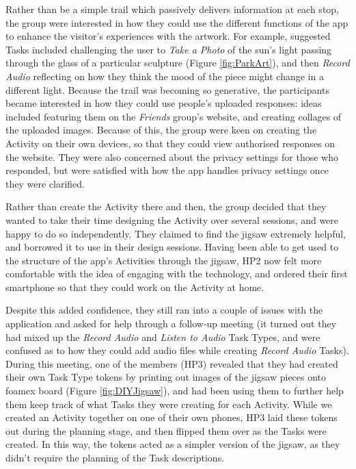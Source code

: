Rather than be a simple trail which passively delivers information at each stop, the group were interested in how they could use the different functions of the app to enhance the visitor's experiences with the artwork. For example, suggested Tasks included challenging the user to \textit{Take a Photo} of the sun's light passing through the glass of a particular sculpture (Figure \ref{fig:ParkArt}), and then \textit{Record Audio} reflecting on how they think the mood of the piece might change in a different light. Because the trail was becoming so generative, the participants became interested in how they could use people's uploaded responses: ideas included featuring them on the \textit{Friends} group's website, and creating collages of the uploaded images. Because of this, the group were keen on creating the Activity on their own devices, so that they could view authorised responses on the website. They were also concerned about the privacy settings for those who responded, but were satisfied with how the app handles privacy settings once they were clarified.

Rather than create the Activity there and then, the group decided that they wanted to take their time designing the Activity over several sessions, and were happy to do so independently. They claimed to find the jigsaw extremely helpful, and borrowed it to use in their design sessions. Having been able to get used to the structure of the app's Activities through the jigsaw, HP2 now felt more comfortable with the idea of engaging with the technology, and ordered their first smartphone so that they could work on the Activity at home.

Despite this added confidence, they still ran into a couple of issues with the application and asked for help through a follow-up meeting (it turned out they had mixed up the \textit{Record Audio} and \textit{Listen to Audio} Task Types, and were confused as to how they could add audio files while creating \textit{Record Audio} Tasks). During this meeting, one of the members (HP3) revealed that they had created their own Task Type tokens by printing out images of the jigsaw pieces onto foamex board (Figure \ref{fig:DIYJigsaw}), and had been using them to further help them keep track of what Tasks they were creating for each Activity. While we created an Activity together on one of their own phones, HP3 laid these tokens out during the planning stage, and then flipped them over as the Tasks were created. In this way, the tokens acted as a simpler version of the jigsaw, as they didn't require the planning of the Task descriptions.


